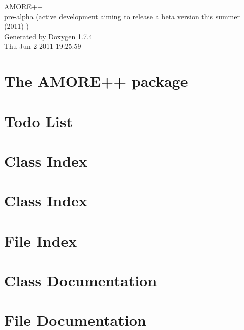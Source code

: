 \documentclass[a4paper]{book}
\begin{document}
\hypersetup{pageanchor=false}
\begin{titlepage}
\vspace*{7cm}
\begin{center}
{\Large AMORE++ \\[1ex]\large pre-\/alpha (active development aiming to release a beta version this summer (2011) ) }\\
\vspace*{1cm}
{\large Generated by Doxygen 1.7.4}\\
\vspace*{0.5cm}
{\small Thu Jun 2 2011 19:25:59}\\
\end{center}
\end{titlepage}
\clearemptydoublepage
{}
\tableofcontents
\clearemptydoublepage
{}
\hypersetup{pageanchor=true}
\chapter{The AMORE++ package}
\label{index}\hypertarget{index}{}
\chapter{Todo List}
\label{todo}
\hypertarget{todo}{}

\chapter{Class Index}

\chapter{Class Index}

\chapter{File Index}

\chapter{Class Documentation}




\chapter{File Documentation}









\printindex
\end{document}
